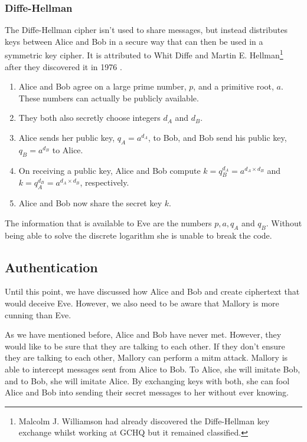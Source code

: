 \subsubsection*{Diffe-Hellman}

The Diffe-Hellman cipher isn't used to share messages, but instead distributes keys between Alice and Bob in a secure way that can then be used in a symmetric key cipher. It is attributed to Whit Diffe and Martin E. Hellman\footnote{Malcolm J. Williamson had already discovered the Diffe-Hellman key exchange whilst working at GCHQ but it remained classified.} after they discovered it in 1976 \cite{}.

\begin{algorithm}
\begin{enumerate}
	\item Alice and Bob agree on a large prime number, $p$, and a primitive root, $a$. These numbers can actually be publicly available.
	\item They both also secretly choose integers $d_A$ and $d_B$.
	\item Alice sends her public key, $q_A = a^{d_A}$, to Bob, and Bob send his public key, $q_B = a^{d_B}$ to Alice.
	\item On receiving a public key, Alice and Bob compute $k = q_B^{d_A} = a^{d_A\times d_B}$ and $k = q_A^{d_B} = a^{d_A\times d_B}$, respectively.
	\item Alice and Bob now share the secret key $k$.
\end{enumerate}
\end{algorithm}

The information that is available to Eve are the numbers $p, a, q_{A}$ and $q_{B}$. Without being able to solve the discrete logarithm she is unable to break the code. 

\subsection{Authentication}

Until this point, we have discussed how Alice and Bob and create ciphertext that would deceive Eve. However, we also need to be aware that Mallory is more cunning than Eve. 

As we have mentioned before, Alice and Bob have never met. However, they would like to be sure that they are talking to each other. If they don't ensure they are talking to each other, Mallory can perform a \ac{mitm} attack. Mallory is able to intercept messages sent from Alice to Bob. To Alice, she will imitate Bob, and to Bob, she will imitate Alice. By exchanging keys with both, she can fool Alice and Bob into sending their secret messages to her without ever knowing.

